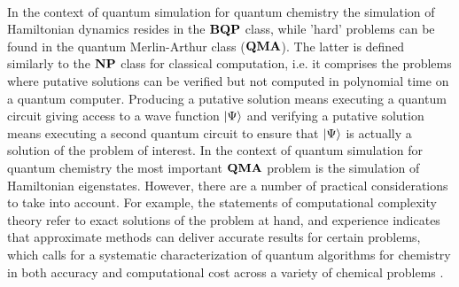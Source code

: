 \\
In the context of quantum simulation for quantum chemistry the simulation of Hamiltonian dynamics resides in the $\bf{BQP}$ class, while 'hard' problems can be found in the quantum Merlin-Arthur class ($\bf{QMA}$). The latter is defined similarly to the $\bf{NP}$ class for classical computation, i.e. it comprises the problems where putative solutions can be verified but not computed in polynomial time on a quantum computer. Producing a putative solution means executing a quantum circuit giving access to a wave function $\ket{\Psi}$ and verifying a putative solution means executing a second quantum circuit to ensure that $\ket{\Psi}$ is actually a solution of the problem of interest. In the context of quantum simulation for quantum chemistry the most important $\bf{QMA}$ problem is the simulation of Hamiltonian eigenstates. However, there are a number of practical considerations to take into account. For example, the statements of computational complexity theory refer to exact solutions of the problem at hand, and experience indicates that approximate methods can deliver accurate results for certain problems, which calls for a systematic characterization of quantum algorithms for chemistry in both accuracy and computational cost across a variety of chemical problems \cite{Motta2021Dec}.

